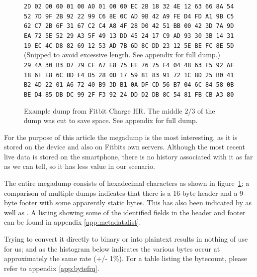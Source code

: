 \documentclass[a4paper,11pt,dvips]{article}
\begin{document}
\begin{figure}
\begin{center}
\begin{framed}
\texttt{2D 02 00 00 01 00 A0 01 00 00 EC 2B 18 32 4E 12 63 66 8A 54 \\
52 7D 9F 2B 92 22 99 C6 8E 0C AD 9B 42 A9 FE D4 FD A1 9B C5 \\
62 C7 2B 6F 31 67 C2 C4 A8 4F 28 D0 42 51 BB 00 42 3D 7A 9D \\
EA 72 5E 52 29 A3 5F 49 13 DD 45 24 17 C9 AD 93 30 3B 14 31 \\
19 EC 4C D8 82 69 12 53 AD 7B 6D 8C DD 23 12 5E BE FC 8E 5D} \\
(Snipped to avoid excessive length. See appendix for full dump.) \\
\texttt{29 4A 30 B3 D7 79 CF A7 E8 75 EE 76 75 F4 04 48 63 F5 92 AF \\
18 6F E8 6C BD F4 D5 28 0D 17 59 81 83 91 72 1C 8D 25 B0 41 \\
B2 4D 22 01 A6 72 40 B9 3D B1 0A DF CD 56 B7 04 6C 84 58 0B \\
BE D4 85 DB DC 99 2F F3 92 24 DD D2 DB 8C 54 81 FB CB A3 80}
\end{framed}
\end{center}
\caption{Example dump from Fitbit Charge HR. The middle 2/3 of the dump was cut to save space. See appendix for full dump.}
\label{fig:megadump}
\end{figure}

For the purpose of this article the megadump is the most interesting, as it is stored on the device and also on Fitbits own servers. Although the most recent live data is stored on the smartphone, there is no history associated with it as far as we can tell, so it has less value in our scenario.

The entire megadump consists of hexadecimal characters as shown in figure~\ref{fig:megadump}; a comparison of multiple dumps indicates that there is a 16-byte header and a 9-byte footer with some apparently static bytes. This has also been indicated by \cite{Allard:2014a} as well as \cite{Aprville:2015b}. A listing showing some of the identified fields in the header and footer can be found in appendix \ref{app:metadatalist}.

Trying to convert it directly to binary or into plaintext results in nothing of use for us; and as the histogram below indicates the various bytes occur at approximately the same rate (+/- 1\%). For a table listing the bytecount, please refer to appendix \ref{app:bytefrq}.
\end{document}
